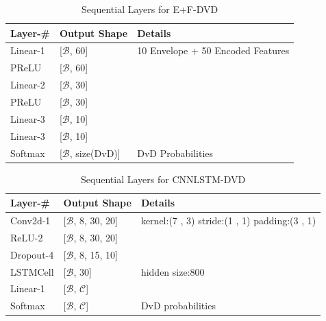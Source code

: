 \documentclass[\main/thesis.tex]{subfiles}
\begin{document}
\begin{center}
    \begin{table}[tbp]
    \centering
    \begin{tabular}{|p{33mm}|p{33mm}|p{50mm}|}
    \hline
    Layer-\# & Output Shape &  Details  \\ \hline
    Linear-1 & [$\mathcal{B}$, 60] &   10 Envelope + 50 Encoded Features \\ \hline
    PReLU & [$\mathcal{B}$, 60] &  \\ \hline
    Linear-2 & [$\mathcal{B}$, 30] & \\ \hline
    PReLU & [$\mathcal{B}$, 30] &  \\ \hline 
    Linear-3 & [$\mathcal{B}$, 10] &  \\ \hline %
    Linear-3 & [$\mathcal{B}$, 10] &  \\ \hline 
    Softmax & [$\mathcal{B}$, size(DvD)] &  DvD Probabilities\\ \hline
    \end{tabular}
    \caption{Sequential Layers for E+F-DVD}
    \label{tab:dvd:EF}
\end{table}
\end{center}


\begin{center}
    \begin{table}[tbp]
    \centering
    \begin{tabular}{|p{28mm}|p{25mm}|p{50mm}|}
    \hline
    Layer-\# & Output Shape & Details  \\ \hline
    Conv2d-1 & [$\mathcal{B}$, 8, 30, 20]  &
    kernel:(7 , 3)\newline                  
    stride:(1 , 1)\newline    
    padding:(3 , 1) \\ \hline
    ReLU-2 & [$\mathcal{B}$, 8, 30, 20] & \\  \hline
    Dropout-4 & [$\mathcal{B}$, 8, 15, 10] &  \\ \hline
    LSTMCell  & [$\mathcal{B}$, 30] & hidden size:800 \\ \hline
    Linear-1 & [$\mathcal{B}$, $\mathcal{C}$] &  \\ \hline 
    Softmax & [$\mathcal{B}$, $\mathcal{C}$] &  DvD probabilities \\ \hline
    \end{tabular}
    \caption{Sequential Layers for CNNLSTM-DVD }
    \label{tab:dvdcnn}
    \end{table} 
\end{center}
\end{document}
